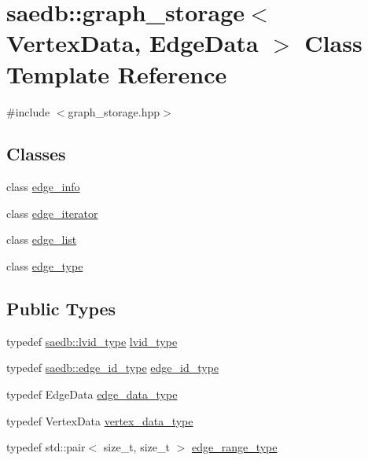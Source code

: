 \hypertarget{classsaedb_1_1graph__storage}{\section{saedb\-:\-:graph\-\_\-storage$<$ Vertex\-Data, Edge\-Data $>$ Class Template Reference}
\label{db/dd8/classsaedb_1_1graph__storage}
}


{\ttfamily \#include $<$graph\-\_\-storage.\-hpp$>$}

\subsection*{Classes}
\begin{DoxyCompactItemize}
\item 
class \hyperlink{classsaedb_1_1graph__storage_1_1edge__info}{edge\-\_\-info}
\item 
class \hyperlink{classsaedb_1_1graph__storage_1_1edge__iterator}{edge\-\_\-iterator}
\item 
class \hyperlink{classsaedb_1_1graph__storage_1_1edge__list}{edge\-\_\-list}
\item 
class \hyperlink{classsaedb_1_1graph__storage_1_1edge__type}{edge\-\_\-type}
\end{DoxyCompactItemize}
\subsection*{Public Types}
\begin{DoxyCompactItemize}
\item 
typedef \hyperlink{namespacesaedb_ae0f2df508bdfd29505d57534c8ed4a65}{saedb\-::lvid\-\_\-type} \hyperlink{classsaedb_1_1graph__storage_a147a907accd64bb1f803a423d04dd04b}{lvid\-\_\-type}
\item 
typedef \hyperlink{namespacesaedb_af76c9a21f199f95828dd18699754cad1}{saedb\-::edge\-\_\-id\-\_\-type} \hyperlink{classsaedb_1_1graph__storage_a7861f26a1e724120e58d9feba4da37a1}{edge\-\_\-id\-\_\-type}
\item 
typedef Edge\-Data \hyperlink{classsaedb_1_1graph__storage_a0b1aa3431f497cae28ac1de81c5004c2}{edge\-\_\-data\-\_\-type}
\item 
typedef Vertex\-Data \hyperlink{classsaedb_1_1graph__storage_a902db48f719c23aa43e6f2570b93055b}{vertex\-\_\-data\-\_\-type}
\item 
typedef std\-::pair$<$ size\-\_\-t, size\-\_\-t $>$ \hyperlink{classsaedb_1_1graph__storage_ab8051ded6bd20175a58af976d3a1ee23}{edge\-\_\-range\-\_\-type}
\end{DoxyCompactItemize}
